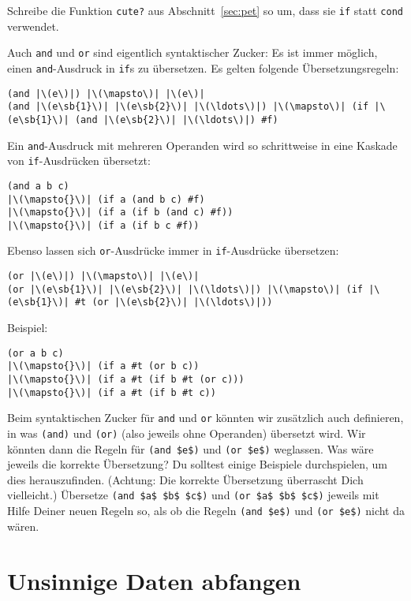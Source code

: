 \begin{aufgabeinline}
  Schreibe die Funktion \lstinline{cute?} aus Abschnitt~\ref{sec:pet} so
  um, dass sie \lstinline{if} statt  \lstinline{cond} verwendet.
\end{aufgabeinline}
%
Auch \lstinline{and} und \lstinline{or} sind eigentlich syntaktischer Zucker:
Es ist immer möglich, einen \lstinline{and}-Ausdruck in \lstinline{if}s
zu übersetzen.  Es gelten folgende Übersetzungsregeln:
%
\begin{lstlisting}
(and |\(e\)|) |\(\mapsto\)| |\(e\)|
(and |\(e\sb{1}\)| |\(e\sb{2}\)| |\(\ldots\)|) |\(\mapsto\)| (if |\(e\sb{1}\)| (and |\(e\sb{2}\)| |\(\ldots\)|) #f)
\end{lstlisting}
%
Ein \lstinline{and}-Ausdruck mit mehreren Operanden wird so schrittweise
in eine Kaskade von \lstinline{if}-Ausdrücken übersetzt:
%
\begin{lstlisting}
(and a b c)
|\(\mapsto{}\)| (if a (and b c) #f)
|\(\mapsto{}\)| (if a (if b (and c) #f))
|\(\mapsto{}\)| (if a (if b c #f))
\end{lstlisting}
%
Ebenso lassen sich \lstinline{or}-Ausdrücke immer in
\lstinline{if}-Ausdrücke übersetzen:
%
\begin{lstlisting}
(or |\(e\)|) |\(\mapsto\)| |\(e\)|
(or |\(e\sb{1}\)| |\(e\sb{2}\)| |\(\ldots\)|) |\(\mapsto\)| (if |\(e\sb{1}\)| #t (or |\(e\sb{2}\)| |\(\ldots\)|))
\end{lstlisting}
%
Beispiel:
%
\begin{lstlisting}
(or a b c)
|\(\mapsto{}\)| (if a #t (or b c))
|\(\mapsto{}\)| (if a #t (if b #t (or c)))
|\(\mapsto{}\)| (if a #t (if b #t c))
\end{lstlisting}
%
\begin{aufgabeinline}
  Beim syntaktischen Zucker für \lstinline{and} und \lstinline{or} könnten
  wir zusätzlich auch definieren, in was \lstinline{(and)} und \lstinline{(or)} (also
  jeweils ohne Operanden) übersetzt wird.  Wir könnten dann die Regeln
  für \lstinline{(and $e$)} und \lstinline{(or $e$)} weglassen. Was wäre jeweils die
  korrekte Übersetzung?  Du solltest einige Beispiele durchspielen, um
  dies herauszufinden.  (Achtung: Die korrekte Übersetzung überrascht
  Dich vielleicht.)  Übersetze \lstinline{(and $a$ $b$ $c$)} und
  \lstinline{(or $a$ $b$ $c$)} jeweils mit Hilfe Deiner neuen Regeln so, als ob die Regeln
  \lstinline{(and $e$)} und \lstinline{(or $e$)} nicht da wären.
\end{aufgabeinline}

\section{Unsinnige Daten abfangen}
\label{sec:nonsensical-data}

